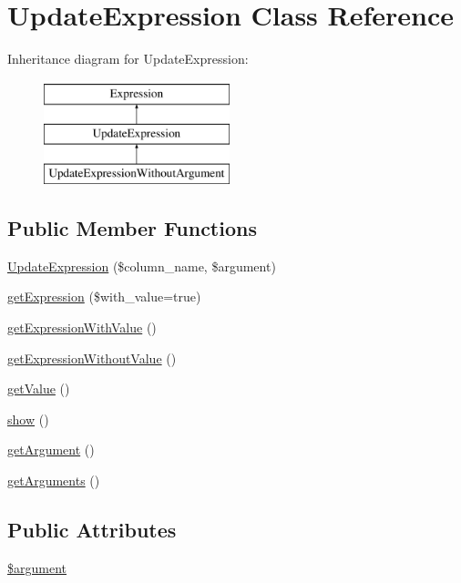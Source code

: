 \hypertarget{classUpdateExpression}{}\section{Update\+Expression Class Reference}
\label{classUpdateExpression}
Inheritance diagram for Update\+Expression\+:\begin{figure}[H]
\begin{center}
\leavevmode
\includegraphics[height=3.000000cm]{classUpdateExpression}
\end{center}
\end{figure}
\subsection*{Public Member Functions}
\begin{DoxyCompactItemize}
\item 
\hyperlink{classUpdateExpression_a3e1cc24e9a7181ef791586f7607b86b9}{Update\+Expression} (\$column\+\_\+name, \$argument)
\item 
\hyperlink{classUpdateExpression_a1824b01ff4d35cec7d284fcd192d1c58}{get\+Expression} (\$with\+\_\+value=true)
\item 
\hyperlink{classUpdateExpression_abf5aa8ed9c023906f684c31ef735ecd6}{get\+Expression\+With\+Value} ()
\item 
\hyperlink{classUpdateExpression_a91fc65199f195dd3c5ef96a6328b7554}{get\+Expression\+Without\+Value} ()
\item 
\hyperlink{classUpdateExpression_a56d4244ba753a420fc8b6db3b10fc9f9}{get\+Value} ()
\item 
\hyperlink{classUpdateExpression_a3d3ea00a85cdf7e086139e4544e757e0}{show} ()
\item 
\hyperlink{classUpdateExpression_a86d860d80b3053bd4bcff511160aca3b}{get\+Argument} ()
\item 
\hyperlink{classUpdateExpression_a898b47f8e6a8191fd75143d402884b02}{get\+Arguments} ()
\end{DoxyCompactItemize}
\subsection*{Public Attributes}
\begin{DoxyCompactItemize}
\item 
\hyperlink{classUpdateExpression_a5ad6b27dd8458bfdd8317006ec1c5983}{\$argument}
\end{DoxyCompactItemize}


